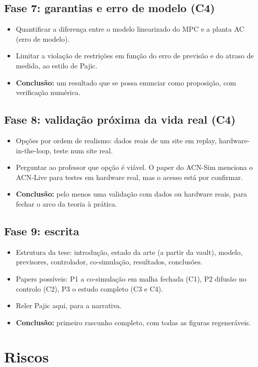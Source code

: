 \documentclass[11pt,a4paper]{article}
\begin{document}
\subsection*{Fase 7: garantias e erro de modelo (C4)}
\begin{itemize}
  \item Quantificar a diferença entre o modelo linearizado do MPC e a planta AC (erro de modelo).
  \item Limitar a violação de restrições em função do erro de previsão e do atraso de medida, ao estilo de Pajic.
  \item \textbf{Conclusão:} um resultado que se possa enunciar como proposição, com verificação numérica.
\end{itemize}

\subsection*{Fase 8: validação próxima da vida real (C4)}
\begin{itemize}
  \item Opções por ordem de realismo: dados reais de um site em replay, hardware-in-the-loop, teste num site real.
  \item Perguntar ao professor que opção é viável. O paper do ACN-Sim menciona o ACN-Live para testes em hardware real, mas o acesso está por confirmar.
  \item \textbf{Conclusão:} pelo menos uma validação com dados ou hardware reais, para fechar o arco da teoria à prática.
\end{itemize}

\subsection*{Fase 9: escrita}
\begin{itemize}
  \item Estrutura da tese: introdução, estado da arte (a partir da vault), modelo, previsores, controlador, co-simulação, resultados, conclusões.
  \item Papers possíveis: P1 a co-simulação em malha fechada (C1), P2 difusão no controlo (C2), P3 o estudo completo (C3 e C4).
  \item Reler Pajic aqui, para a narrativa.
  \item \textbf{Conclusão:} primeiro rascunho completo, com todas as figuras regeneráveis.
\end{itemize}

\section{Riscos}
\end{document}
